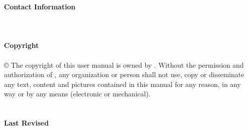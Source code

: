 {
    
    \large\textbf{Contact Information} \\
    \sixsnow\sixsnow\sixsnow\sixsnow\sixsnow\sixsnow\sixsnow\sixsnow\sixsnow\\
    \\
    \\
    \large \textbf{Copyright} \\
    \sixsnow\sixsnow\sixsnow\sixsnow\sixsnow\sixsnow\sixsnow\sixsnow\sixsnow\\
    © The copyright of this user manual is owned by \sixsnow\sixsnow\sixsnow\sixsnow\sixsnow\sixsnow\sixsnow. Without the permission and authorization of \sixsnow\sixsnow\sixsnow\sixsnow\sixsnow\sixsnow\sixsnow\sixsnow\sixsnow\sixsnow\sixsnow\sixsnow\sixsnow , 
    any organization or person shall not use, copy or disseminate any text, content and pictures contained in this manual for any reason, 
    in any way or by any means (electronic or mechanical).\\
    \\
    \\
	\large \textbf{Last Revised} \\
	\thesisDate \\
}
